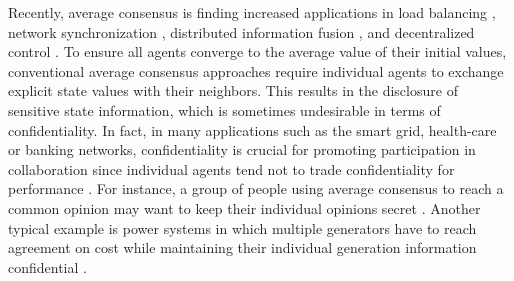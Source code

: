 \documentclass{IEEEtran}
\begin{document}
Recently, average consensus is finding increased applications in load balancing \cite{boillat1990load, cybenko1989dynamic}, network synchronization \cite{lynch1996distributed}, distributed information fusion \cite{scherber2004locally, xiao2005scheme}, and decentralized control \cite{olfati2004consensus, ren2005consensus}. To ensure all agents converge to the average value of their initial values, conventional average consensus approaches require individual agents to exchange explicit state values with their neighbors. This results in the disclosure of sensitive state information, which is sometimes undesirable in terms of confidentiality. In fact, in many applications such as the smart grid, health-care or banking networks, confidentiality is crucial for promoting participation in collaboration since individual agents tend not to trade confidentiality for performance \cite{mangasarian2011privacy, hoenkamp2011neglected, lou2017privacy}. For instance, a group of people using average consensus to reach a common opinion may want to keep their individual opinions secret \cite{tsitsiklis1984problems}. Another typical example is power systems in which multiple generators have to reach agreement on cost while maintaining their individual generation information confidential \cite{zhang2011incremental}.
\end{document}
